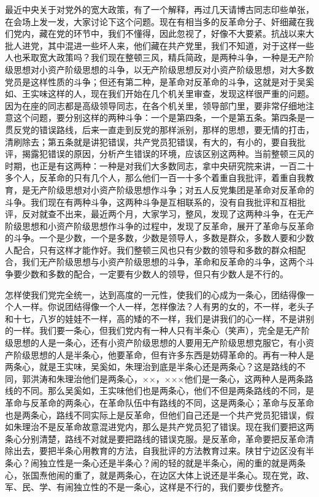 最近中央关于对党外的宽大政策，有了一个解释，再过几天请博古同志印些单张，在会场上发一发，大家讨论下这个问题。现在有相当多的反革命分子、奸细藏在我们党内，藏在党的环节中，我们不懂得，因此忽视了，好像不大要紧。抗战以来大批人进党，其中混进一些坏人来，他们藏在共产党里，我们不知道，对于这样一些人也釆取宽大政策吗？我们现在整顿三风，精兵简政，是两种斗争，一种是无产阶级思想对小资产阶级思想的斗争，以无产阶级思想反对小资产阶级思想，对大多数党员是这样性质的斗争；但还有第二种，是革命对反革命的斗争，这就是对于吴奚如、王实味这样的人，现在我们开始在几个机关里审查，发现这样很严重的问题。因为在座的同志都是高级领导同志，在各个机关里，领导部门里，要非常仔细地注意这个问题，要分别这样的两种斗争：一个是第四条，一个是第五条。第四条是一贯反党的错误路线，后来一直走到反党的那样派别，那样的思想，要无情的打击，清刷除去；第五条就是讲犯错误，共产党员犯错误，有大的，有小的，要自我批评，揭露犯错误的原因，分析产生错误的环境，应该区别这两种。当前整顿三风的时期，也正是有这两种：一种是对我们大多数同志，拿中央研究院来讲，一百二十多个人，反革命的只有几个人，那么他们一百一十多个着重自我批评，着重自我教育，是无产阶级思想对小资产阶级思想作斗争；对五人反党集团是革命对反革命的斗争。我们现在有两种斗争，这两种斗争是互相联系的，没有自我批评和互相批评，反对就查不出来，最近两个月，大家学习，整风，发现了这两种斗争，在无产阶级思想和小资产阶级思想作斗争的过程中，发现了反革命，展开了革命与反革命的斗争。一个是少数，一个是多数，少数是领导人，多数是群众，多数人要和少数人配合，只有这样才能作好。我们整顿三风也只有少数的领导和多数的群众相配合，我们无产阶级思想与小资产阶级思想的斗争，革命和反革命的斗争，这两个斗争要少数和多数的配合，一定要有少数人的领导，但只有少数人是不行的。

怎样使我们党完全统一，达到高度的一元性，使我们的心成为一条心，团结得像一个人一样。你说团结得像一个人一样，怎样像法？人有男的女的，不一样，老头子和十七，八岁的娃娃不一样，高的矮的不一样，我们是讲我们的心一样，不是讲别的一样。我们要一条心，但我们党内有一种人只有半条心（笑声），完全是无产阶级思想的人是一条心，还有小资产阶级思想的人要用无产阶级思想克服它，有小资产阶级思想的人是半条心，他要革命，但有许多东西是妨碍革命的。再有一种人是两条心，就是王实味，吴奚如，朱理治到底是半条心还是两条心？这是路线的不同，郭洪涛和朱理治他们是两条心，××，×××他们是一条心，这两种人是两条路线的不同。那么吴奚如，王实味他们也是两条心，他们不但是两条路线的不同，是革命与反革命的两条心，在革命队伍中有路线的不同，这是两条心；革命与反革命也是两条心，路线不同实际上是反革命，但他们自己还是一个共产党员犯错误，假如朱理治不是反革命故意混进党内，那么是共产党员犯了错误。现在我们要把这两条心分别清楚，路线不对就是要把路线的错误克服。是反革命，革命要把反革命清除出去，要把半条心用教育的方法，自我批评的方法教育过来。陕甘宁边区没有半条心？闹独立性是一条心还是半条心？闹的轻的就是半条心，闹的重的就是两条心，张国焘他闹的重了，就是两条心，在边区大体上说还是半条心。现在党，政、军、民、学、有闹独立性的不是一条心，这样是不行的，我们要步伐整齐。

